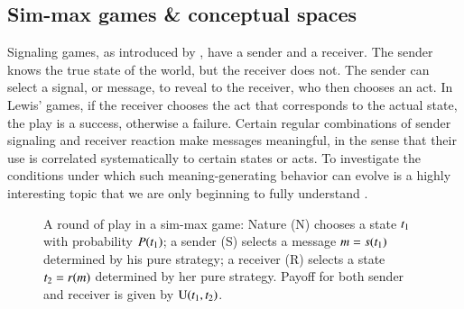 \documentclass[fleqn,reqno,10pt]{article}
\newcommand{\similarity}{\ensuremath{\mathrm{Sim}}} %
\renewcommand{\Pr}{\ensuremath{P}}
\begin{document}
\subsection{Sim-max games \& conceptual spaces}

Signaling games, as introduced by \citet{Lewis_1969:Convention}, have
a sender and a receiver. The sender knows the true state of the world,
but the receiver does not. The sender can select a signal, or message,
to reveal to the receiver, who then chooses an act. In Lewis' games,
if the receiver chooses the act that corresponds to the actual state,
the play is a success, otherwise a failure. Certain regular
combinations of sender signaling and receiver reaction make messages
meaningful, in the sense that their use is correlated systematically
to certain states or acts. To investigate the conditions under which
such meaning-generating behavior can evolve is a highly interesting
topic that we are only beginning to fully understand
\citep[e.g.][]{Warneryd1993:Cheap-Talk-Coor,BlumeKim1993:Evolutionary-St,Huttegger2007:Evolution-and-t,Pawlowitsch2008:Why-Evolution-d,Barrett2009:The-Evolution-o,HutteggerSkyrms2010:Evolutionary-Dy,Skyrms2010:Signals}.

\begin{figure}
  \centering


  \caption{A round of play in a sim-max game: Nature (N) chooses a state $t_{\mathrm{1}}$ with probability $\Pr(\mystate{1})$; a sender (S) selects a message $m = s(t_{\mathrm{1}})$ determined by his pure strategy; a receiver (R) selects a state $t_{\mathrm{2}} = r(m)$ determined by her pure strategy. Payoff for both sender and receiver is given by $\mathrm{U}(t_{\mathrm{1}}, t_{\mathrm{2}})$.}
  \label{fig:sim-max-illustration}
\end{figure}
\end{document}
